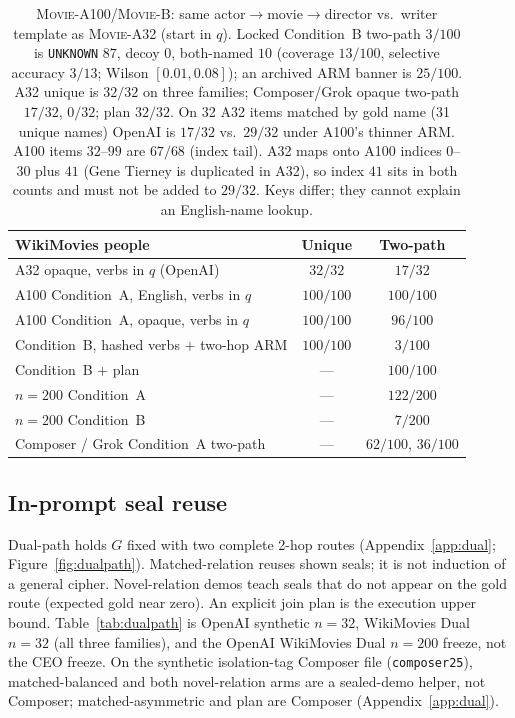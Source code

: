 \documentclass[10pt]{article} %
\begin{document}
\begin{table}[ht]
\centering
\small
\setlength{\tabcolsep}{3.2pt}

\caption{\textsc{Movie-A100}/\textsc{Movie-B}: same
actor$\to$movie$\to$director vs.\ writer template as \textsc{Movie-A32}
\citep{miller2016wikimovies,zhang2018metaqa} (start in $q$).
Locked Condition~B two-path $3/100$ is \texttt{UNKNOWN} $87$, decoy $0$,
both-named $10$ (coverage $13/100$, selective accuracy $3/13$;
Wilson $[0.01,0.08]$); an archived ARM banner is $25/100$.
A32 unique is $32/32$ on three families; Composer/Grok opaque two-path
$17/32$, $0/32$; plan $32/32$.
On 32 A32 items matched by gold name (31 unique names) OpenAI is $17/32$
vs.\ $29/32$ under A100's thinner ARM.
A100 items $32$--$99$ are $67/68$ (index tail).
A32 maps onto A100 indices $0$--$30$ plus $41$ (Gene Tierney is duplicated
in A32), so index $41$ sits in both counts and must not be added to
$29/32$. Keys differ; they cannot explain an English-name lookup.}
\label{tab:wiki100}
\begin{tabular}{@{}lcc@{}}
\toprule
WikiMovies people & Unique & Two-path \\
\midrule
A32 opaque, verbs in $q$ (OpenAI) & $32/32$ & $17/32$ \\
A100 Condition~A, English, verbs in $q$ & $100/100$ & $100/100$ \\
A100 Condition~A, opaque, verbs in $q$ & $100/100$ & $96/100$ \\
Condition~B, hashed verbs $+$ two-hop ARM & $100/100$ & $3/100$ \\
Condition~B $+$ plan & --- & $100/100$ \\
$n{=}200$ Condition~A & --- & $122/200$ \\
$n{=}200$ Condition~B & --- & $7/200$ \\
Composer / Grok Condition~A two-path & --- & $62/100$, $36/100$ \\
\bottomrule
\end{tabular}

\end{table}
\FloatBarrier

\subsection{In-prompt seal reuse}
\label{sec:dual}

Dual-path holds $G$ fixed with two complete 2-hop routes
(Appendix~\ref{app:dual}; Figure~\ref{fig:dualpath}).
Matched-relation reuses shown seals; it is not induction of a general cipher.
Novel-relation demos teach seals that do not appear on the gold route
(expected gold near zero).
An explicit join plan is the execution upper bound.
Table~\ref{tab:dualpath} is OpenAI synthetic $n{=}32$, WikiMovies Dual
$n{=}32$ (all three families), and the OpenAI WikiMovies Dual $n{=}200$
freeze, not the CEO freeze.
On the synthetic isolation-tag Composer file (\texttt{composer25}),
matched-balanced and both novel-relation arms are a sealed-demo helper,
not Composer; matched-asymmetric and plan are Composer
(Appendix~\ref{app:dual}).
\end{document}
